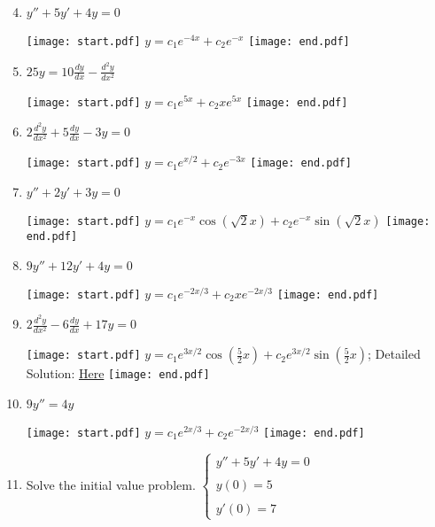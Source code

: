 \documentclass[12pt]{article}
\begin{document}
 
\begin{enumerate}
\setcounter{enumi}{3}
  
\item $y''+5y'+4y=0$

\texttt{[image: start.pdf]}
{{$y=c_1e^{-4x}+c_2e^{-x}$}}
\texttt{[image: end.pdf]}


\item $25y=10\frac{dy}{dx}-\frac{d^2y}{dx^2}$

\texttt{[image: start.pdf]}
{{$y=c_1e^{5x}+c_2xe^{5x}$}}
\texttt{[image: end.pdf]}


\item $2\frac{d^2y}{dx^2}+5\frac{dy}{dx}-3y=0$

\texttt{[image: start.pdf]}
{{$y=c_1e^{x/2}+c_2e^{-3x}$}}
\texttt{[image: end.pdf]}


\item $y''+2y'+3y=0$

\texttt{[image: start.pdf]}
{{$y=c_1e^{-x}\cos\left(\sqrt{2}x\right)+c_2e^{-x}\sin\left(\sqrt{2}x\right)$}}
\texttt{[image: end.pdf]}


\item $9y''+12y'+4y=0$

\texttt{[image: start.pdf]}
{{$y=c_1e^{-2x/3}+c_2xe^{-2x/3}$}}
\texttt{[image: end.pdf]}


\item $2\frac{d^2y}{dx^2}-6\frac{dy}{dx}+17y=0$

\texttt{[image: start.pdf]}
{{$y=c_1e^{3x/2}\cos\left(\frac{5}{2}x\right)+c_2e^{3x/2}\sin\left(\frac{5}{2}x\right)$; Detailed Solution: \textcolor{blue}{\href{http://www.math.drexel.edu/classes/Calculus/resources/Math123HW/Solutions/123_04_Second_Order_ODEs_09.pdf}{Here}}}}
\texttt{[image: end.pdf]}



\item $9y''=4y$

\texttt{[image: start.pdf]}
{{$y=c_1e^{2x/3}+c_2e^{-2x/3}$}}
\texttt{[image: end.pdf]}


\item Solve the initial value problem. \newline \newline
$\left\{\begin{array}{l}
y''+5y'+4y=0
\\ \\
y(0)=5
\\ \\
y'(0)=7
\end{array}\right.$


\end{enumerate}
\end{document}
